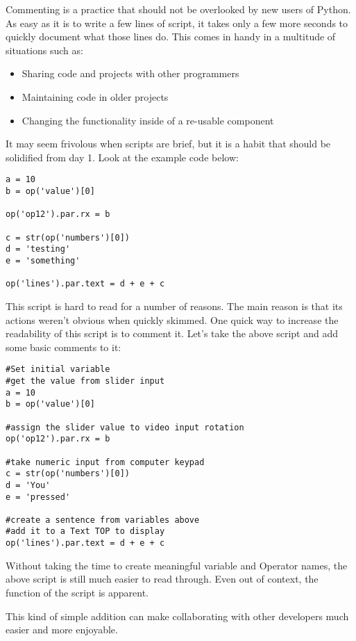 \begin{fullwidth}

Commenting is a practice that should not be overlooked by new users of Python. As easy as it is to write a few lines of script, it takes only a few more seconds to quickly document what those lines do. This comes in handy in a multitude of situations such as:

\begin{itemize}
\item Sharing code and projects with other programmers
\item Maintaining code in older projects
\item Changing the functionality inside of a re-usable component
\end{itemize}


It may seem frivolous when scripts are brief, but it is a habit that should be solidified from day 1. Look at the example code below:

\begin{lstlisting}
a = 10
b = op('value')[0]

op('op12').par.rx = b

c = str(op('numbers')[0])
d = 'testing'
e = 'something'

op('lines').par.text = d + e + c
\end{lstlisting}

This script is hard to read for a number of reasons. The main reason is that its actions weren't obvious when quickly skimmed. One quick way to increase the readability of this script is to comment it. Let's take the above script and add some basic comments to it:

\begin{lstlisting}
#Set initial variable
#get the value from slider input
a = 10
b = op('value')[0]

#assign the slider value to video input rotation
op('op12').par.rx = b

#take numeric input from computer keypad
c = str(op('numbers')[0])
d = 'You'
e = 'pressed'

#create a sentence from variables above
#add it to a Text TOP to display
op('lines').par.text = d + e + c
\end{lstlisting}

Without taking the time to create meaningful variable and Operator names, the above script is still much easier to read through. Even out of context, the function of the script is apparent.

This kind of simple addition can make collaborating with other developers much easier and more enjoyable.

\end{fullwidth}


